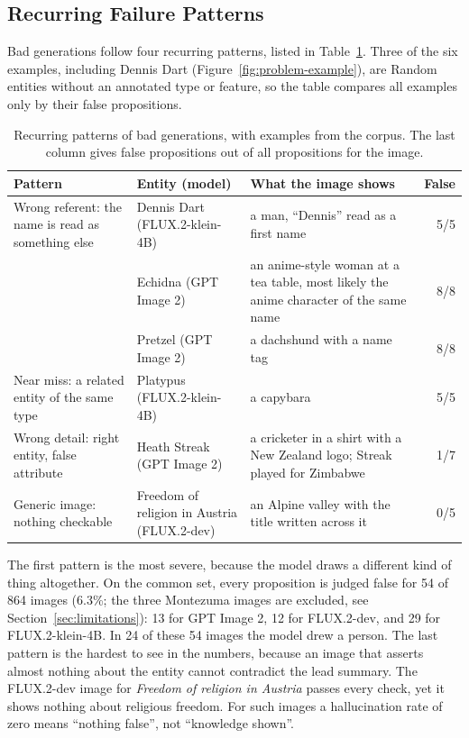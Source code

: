 \subsection{Recurring Failure Patterns}

Bad generations follow four recurring patterns, listed in
Table~\ref{tab:failure-patterns}. Three of the six examples, including Dennis Dart
(Figure~\ref{fig:problem-example}), are Random entities without an annotated type
or feature, so the table compares all examples only by their false propositions.

\begin{table}[ht]
\centering
\footnotesize
\caption{Recurring patterns of bad generations, with examples from the corpus.
The last column gives false propositions out of all propositions for the image.}
\label{tab:failure-patterns}
\begin{tabular}{>{\raggedright\arraybackslash}p{3.3cm}>{\raggedright\arraybackslash}p{3.6cm}>{\raggedright\arraybackslash}p{5.0cm}r}
\toprule
Pattern & Entity (model) & What the image shows & False \\
\midrule
Wrong referent: the name is read as something else
 & Dennis Dart (FLUX.2-klein-4B) & a man, ``Dennis'' read as a first name & 5/5 \\
 & Echidna (GPT Image 2) & an anime-style woman at a tea table, most likely the anime character of the same name & 8/8 \\
 & Pretzel (GPT Image 2) & a dachshund with a name tag & 8/8 \\
\midrule
Near miss: a related entity of the same type
 & Platypus (FLUX.2-klein-4B) & a capybara & 5/5 \\
\midrule
Wrong detail: right entity, false attribute
 & Heath Streak (GPT Image 2) & a cricketer in a shirt with a New Zealand logo; Streak played for Zimbabwe & 1/7 \\
\midrule
Generic image: nothing checkable
 & Freedom of religion in Austria (FLUX.2-dev) & an Alpine valley with the title written across it & 0/5 \\
\bottomrule
\end{tabular}
\end{table}

The first pattern is the most severe, because the model draws a different kind
of thing altogether. On the common set, every proposition is judged false for
54 of 864 images (6.3\%; the three Montezuma images are excluded, see
Section~\ref{sec:limitations}): 13 for GPT Image 2, 12 for FLUX.2-dev, and 29
for FLUX.2-klein-4B. In 24 of these 54 images the model drew a person. The last
pattern is the hardest to see in the numbers, because an image that asserts
almost nothing about the entity cannot contradict the lead summary. The FLUX.2-dev
image for \emph{Freedom of religion in Austria} passes every check, yet it shows
nothing about religious freedom. For such images a hallucination rate of zero
means ``nothing false'', not ``knowledge shown''.

